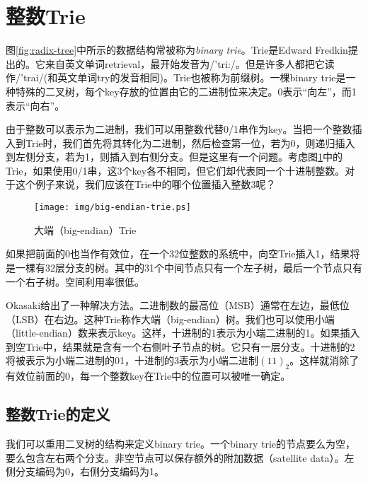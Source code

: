 \documentclass[UTF8]{article}
\begin{document}
\section{整数Trie}
\label{int-trie}

图\ref{fig:radix-tree}中所示的数据结构常被称为\emph{binary trie}。Trie是Edward Fredkin提出的。它来自英文单词retrieval，最开始发音为/'tri:/。但是许多人都把它读作/'trai/(和英文单词try的发音相同)\cite{wiki-trie}。Trie也被称为前缀树。一棵binary trie是一种特殊的二叉树，每个key存放的位置由它的二进制位来决定。0表示“向左”，而1表示“向右”\cite{okasaki-int-map}。

由于整数可以表示为二进制，我们可以用整数代替0/1串作为key。当把一个整数插入到Trie时，我们首先将其转化为二进制，然后检查第一位，若为0，则递归插入到左侧分支，若为1，则插入到右侧分支。但是这里有一个问题。考虑图\ref{fig:big-endian-trie}中的Trie，如果使用0/1串，这3个key各不相同，但它们却代表同一个十进制整数。对于这个例子来说，我们应该在Trie中的哪个位置插入整数3呢？

\begin{figure}[htbp]
  \centering
  \texttt{[image: img/big-endian-trie.ps]}
  \caption{大端（big-endian）Trie} \label{fig:big-endian-trie}
\end{figure}

如果把前面的0也当作有效位，在一个32位整数的系统中，向空Trie插入1，结果将是一棵有32层分支的树。其中的31个中间节点只有一个左子树，最后一个节点只有一个右子树。空间利用率很低。

Okasaki给出了一种解决方法\cite{okasaki-int-map}。二进制数的最高位（MSB）通常在左边，最低位（LSB）在右边。这种Trie称作大端（big-endian）树。我们也可以使用小端（little-endian）数来表示key。这样，十进制的1表示为小端二进制的1。如果插入到空Trie中，结果就是含有一个右侧叶子节点的树。它只有一层分支。十进制的2将被表示为小端二进制的01，十进制的3表示为小端二进制$(11)_2$。这样就消除了有效位前面的0，每一个整数key在Trie中的位置可以被唯一确定。

\subsection{整数Trie的定义}
我们可以重用二叉树的结构来定义binary trie。一个binary trie的节点要么为空，要么包含左右两个分支。非空节点可以保存额外的附加数据（satellite data）。左侧分支编码为0，右侧分支编码为1。
\end{document}
